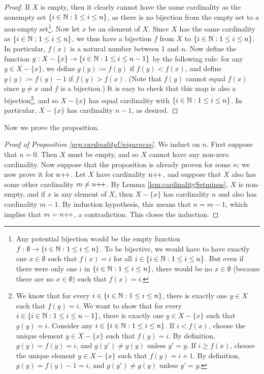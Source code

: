 \documentclass[../main.tex]{subfiles}
\begin{document}
\begin{itemize}
\begin{lem}
        \begin{proof}
            If $X$ is empty, then it clearly cannot have the same cardinality as the nonempty set $\{i\in\mathbb{N}:1\leq i\leq n\}$, as there is no bijection from the empty set to a non-empty set\footnote{Any potential bijection would be the empty function $f:\emptyset\to\{i\in\mathbb{N}:1\leq i\leq n\}$. To be bijective, we would have to have exactly one $x\in\emptyset$ such that $f(x)=i$ for all $i\in\{i\in\mathbb{N}:1\leq i\leq n\}$. But even if there were only one $i$ in $\{i\in\mathbb{N}:1\leq i\leq n\}$, there would be no $x\in\emptyset$ (because there are no $x\in\emptyset$) such that $f(x)=i$.}. Now let $x$ be an element of $X$. Since $X$ has the same cardinality as $\{i\in\mathbb{N}:1\leq i\leq n\}$, we thus have a bijection $f$ from $X$ to $\{i\in\mathbb{N}:1\leq i\leq n\}$. In particular, $f(x)$ is a natural number between 1 and $n$. Now define the function $g:X-\{x\}\to\{i\in\mathbb{N}:1\leq i\leq n-1\}$ by the following rule: for any $y\in X-\{x\}$, we define $g(y):=f(y)$ if $f(y)<f(x)$, and define $g(y):=f(y)-1$ if $f(y)>f(x)$. (Note that $f(y)$ cannot equal $f(x)$ since $y\neq x$ and $f$ is a bijection.) It is easy to check that this map is also a bijection\footnote{We know that for every $i\in\{i\in\mathbb{N}:1\leq i\leq n\}$, there is exactly one $y\in X$ such that $f(y)=i$. We want to show that for every $i\in\{i\in\mathbb{N}:1\leq i\leq n-1\}$, there is exactly one $y\in X-\{x\}$ such that $g(y)=i$. Consider any $i\in\{i\in\mathbb{N}:1\leq i\leq n\}$. If $i<f(x)$, choose the unique element $y\in X-\{x\}$ such that $f(y)=i$. By definition, $g(y)=f(y)=i$, and $g(y')\neq g(y)$ unless $y'=y$. If $i\geq f(x)$, choose the unique element $y\in X-\{x\}$ such that $f(y)=i+1$. By definition, $g(y)=f(y)-1=i$, and $g(y')\neq g(y)$ unless $y'=y$.}, and so $X-\{x\}$ has equal cardinality with $\{i\in\mathbb{N}:1\leq i\leq n\}$. In particular, $X-\{x\}$ has cardinality $n-1$, as desired.
        \end{proof}
    \end{lem}
    Now we prove the proposition.
    \begin{proof}[Proof of Proposition \ref{prp:cardinalityUniqueness}]
        We induct on $n$. First suppose that $n=0$. Then $X$ must be empty, and so $X$ cannot have any non-zero cardinality. Now suppose that the proposition is already proven for some $n$; we now prove it for $n{+\!+}$. Let $X$ have cardinality $n{+\!+}$, and suppose that $X$ also has some other cardinality $m\neq n{+\!+}$. By Lemma \ref{lem:cardinalitySetminus}, $X$ is non-empty, and if $x$ is any element of $X$, then $X-\{x\}$ has cardinality $n$ and also has cardinality $m-1$. By induction hypothesis, this means that $n=m-1$, which implies that $m=n{+\!+}$, a contradiction. This closes the induction.
    \end{proof}
\end{itemize}
\end{document}
